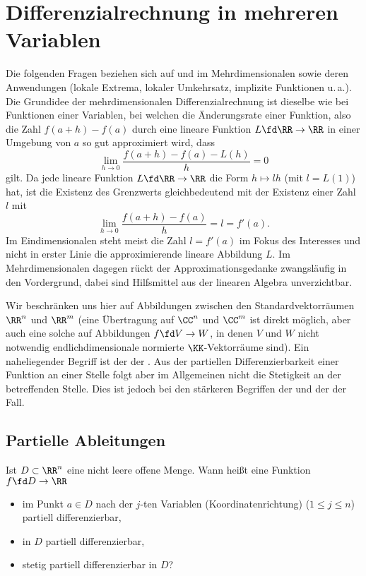 \chapter{Differenzialrechnung in mehreren Variablen}

Die folgenden Fragen beziehen sich auf  
und  im Mehrdimensionalen sowie 
deren Anwendungen (lokale Extrema, lokaler Umkehrsatz, 
implizite Funktionen u.\,a.). Die Grundidee der mehrdimensionalen 
Differenzialrechnung ist dieselbe wie bei Funktionen einer Variablen, bei 
welchen die Änderungsrate einer Funktion, also die 
Zahl $f(a+h)-f(a)$ durch eine lineare Funktion $L\fd \RR\to\RR$ in einer 
Umgebung von $a$ so gut approximiert wird, dass 
\[
\lim_{h\to 0} \frac{f(a+h)-f(a)-L(h)}{h} =0 
\]
gilt. Da jede lineare Funktion $L \fd\RR\to\RR$ die Form $h\mapsto lh$ 
(mit $l=L(1)$) hat, ist die Existenz des Grenzwerts gleichbedeutend 
mit der Existenz einer Zahl $l$ mit
\[
\lim_{h\to 0} \frac{f(a+h)-f(a)}{h} = l = f'(a).
\] 
Im Eindimensionalen steht meist die Zahl $l=f'(a)$ im Fokus des Interesses 
und nicht in erster Linie die approximierende lineare Abbildung $L$. 
Im Mehrdimensionalen dagegen rückt der Approximationsgedanke zwangsläufig 
in den Vordergrund, dabei sind Hilfsmittel aus der linearen Algebra 
unverzichtbar. 

Wir beschränken uns hier auf Abbildungen zwischen den Standardvektorräumen 
$\RR^n$ und $\RR^m$ (eine Übertragung auf $\CC^n$ und $\CC^m$ ist 
direkt möglich, aber auch eine solche auf Abbildungen 
$f\fd V\to W$, in denen $V$ und $W$ nicht notwendig 
endlichdimensionale normierte $\KK$-Vektorräume sind). Ein naheliegender 
Begriff ist der der . Aus der 
partiellen Differenzierbarkeit einer Funktion an einer Stelle folgt 
aber im Allgemeinen nicht die Stetigkeit an der betreffenden Stelle. Dies 
ist jedoch bei den stärkeren Begriffen der  und der  
der Fall.

\section{Partielle Ableitungen}

\begin{frage}
  Ist $D\subset \RR^n$ eine nicht leere offene Menge. Wann heißt eine 
  Funktion $f \fd D\to \RR$ 
  \begin{itemize}[2mm]
  \item[\desc{a}] im Punkt $a\in D$ nach der $j$-ten Variablen 
    (Koordinatenrichtung) ($1\le j \le n$)  
    partiell differenzierbar, \\[-3.5mm]
  \item[\desc{b}] in $D$ partiell differenzierbar, \\[-3.5mm]
  \item[\desc{c}] stetig partiell differenzierbar in $D$?
  \end{itemize}
\end{frage}



